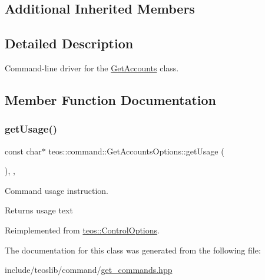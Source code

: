 \subsection*{Additional Inherited Members}


\subsection{Detailed Description}
Command-\/line driver for the \mbox{\hyperlink{classteos_1_1command_1_1_get_accounts}{Get\+Accounts}} class. 

\subsection{Member Function Documentation}
\mbox{\label{classteos_1_1command_1_1_get_accounts_options_ac93b806fa601124aa899474da62d1288}} 
\subsubsection{\texorpdfstring{get\+Usage()}{getUsage()}}
{\footnotesize\ttfamily const char$\ast$ teos\+::command\+::\+Get\+Accounts\+Options\+::get\+Usage (\begin{DoxyParamCaption}{ }\end{DoxyParamCaption})\hspace{0.3cm}{\ttfamily [inline]}, {\ttfamily [protected]}, {\ttfamily [virtual]}}



Command \textquotesingle{}usage\textquotesingle{} instruction. 

\begin{DoxyReturn}{Returns}
usage text 
\end{DoxyReturn}


Reimplemented from \mbox{\hyperlink{classteos_1_1_control_options_a0aa5671f9bc750ed5280c26c543874f3}{teos\+::\+Control\+Options}}.



The documentation for this class was generated from the following file\+:\begin{DoxyCompactItemize}
\item 
include/teoslib/command/\mbox{\hyperlink{get__commands_8hpp}{get\+\_\+commands.\+hpp}}\end{DoxyCompactItemize}
